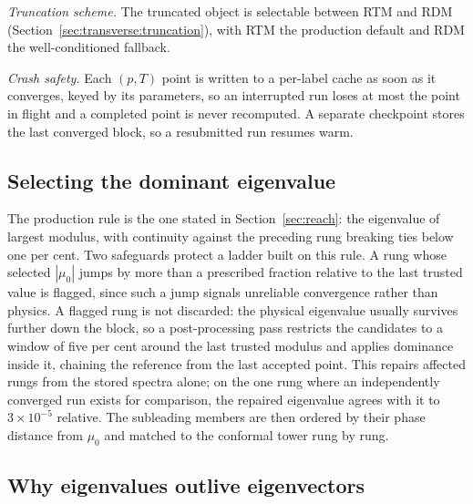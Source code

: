 \textit{Truncation scheme.} The truncated object is selectable between \ac{RTM} and \ac{RDM} (Section~\ref{sec:transverse:truncation}), with RTM the production default and RDM the well-conditioned fallback.

\textit{Crash safety.} Each $(p,T)$ point is written to a per-label cache as soon as it converges, keyed by its parameters, so an interrupted run loses at most the point in flight and a completed point is never recomputed. A separate checkpoint stores the last converged block, so a resubmitted run resumes warm.

\subsection{Selecting the dominant eigenvalue}
\label{app:selector}

The production rule is the one stated in Section~\ref{sec:reach}: the eigenvalue of largest modulus, with continuity against the preceding rung breaking ties below one per cent. Two safeguards protect a ladder built on this rule. A rung whose selected $|\mu_0|$ jumps by more than a prescribed fraction relative to the last trusted value is flagged, since such a jump signals unreliable convergence rather than physics. A flagged rung is not discarded: the physical eigenvalue usually survives further down the block, so a post-processing pass restricts the candidates to a window of five per cent around the last trusted modulus and applies dominance inside it, chaining the reference from the last accepted point. This repairs affected rungs from the stored spectra alone; on the one rung where an independently converged run exists for comparison, the repaired eigenvalue agrees with it to $3\times10^{-5}$ relative. The subleading members are then ordered by their phase distance from $\mu_0$ and matched to the conformal tower rung by rung.

\subsection{Why eigenvalues outlive eigenvectors}
\label{app:conditioning}

